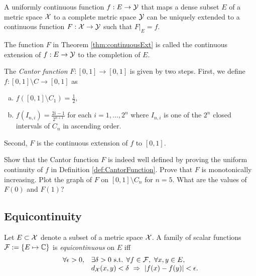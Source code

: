 \begin{thm}
  \label{thm:continuousExt}
  A uniformly continuous function $f: E \rightarrow {\cal Y}$ 
  that maps a dense subset $E$ of a metric space ${\cal X}$
  to a complete metric space ${\cal Y}$
  can be uniquely extended to a continuous function
  $F: {\cal X}\rightarrow {\cal Y}$ such that
  $F|_{E} = f$.
\end{thm}


\begin{defn}
  \label{def:continuousExt}
  The function $F$ in Theorem \ref{thm:continuousExt}
  is called the continuous extension of $f:E\rightarrow {\cal Y}$
  to the completion of $E$.
\end{defn}

\begin{defn}
  \label{def:CantorFunction}
  The \emph{Cantor function} $F:[0,1]\rightarrow[0,1]$
  is given by two steps.
  First, we define $f:[0,1]\setminus C \rightarrow[0,1]$
  as
  \begin{enumerate}[(a)]\itemsep0em
  \item %
    $f([0,1]\setminus C_1)=\frac{1}{2}$,
  \item $f(I_{n,i})=\frac{2i-1}{2^{n+1}}$
    for each $i=1,\ldots,2^n$
    where $I_{n,i}$ is one of the $2^{n}$ closed intervals
    of $C_n$ in ascending order.
  \end{enumerate}
  Second, $F$ is the continuous extension of $f$
  to $[0,1]$. 
\end{defn}

\begin{exc}
  \label{exc:CantorFuncWellDefined}
  Show that the Cantor function $F$
  is indeed well defined
  by proving the uniform continuity
  of $f$ in Definition \ref{def:CantorFunction}.
  Prove that $F$ is monotonically increasing.
  Plot the graph of $F$
  on $[0,1]\setminus C_n$ for $n=5$. 
  What are the values of $F(0)$ and $F(1)$?
\end{exc}


\subsection{Equicontinuity}

\begin{defn}
  \label{def:equcontinuity}
  Let $E\subset{\cal X}$ denote a subset
  of a metric space ${\cal X}$.
  A family of scalar functions
  ${\cal F}:=\{E\mapsto \mathbb{C}\}$
  is \emph{equicontinuous} on $E$
  iff
  \begin{equation}
    \label{eq:equcontinuity}
    \begin{array}{{rl}}
    \forall \epsilon>0, &\exists \delta>0 \text{ s.t. }
    \forall f\in{\cal F},\ \forall x,y\in E,\ \\
      &d_{\cal X}(x,y)<\delta\ \Rightarrow\ |f(x)-f(y)|<\epsilon.
    \end{array}
  \end{equation}
\end{defn}


